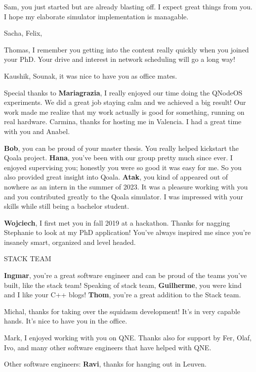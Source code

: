 Sam, you just started but are already blasting off. I expect great things from you.
I hope my elaborate simulator implementation is managable.

Sacha, 
Felix,

Thomas, I remember you getting into the content really quickly when you joined your PhD. Your drive and interest in network scheduling will go a long way!

Kaushik, Sounak, it was nice to have you as office mates.

Special thanks to \textbf{Mariagrazia}, I really enjoyed our time doing the QNodeOS experiments. We did a great job staying calm and we achieved a big result! Our work made me realize that my work actually is good for something, running on real hardware.
Carmina, thanks for hosting me in Valencia. I had a great time with you and Anabel.

\textbf{Bob}, you can be proud of your master thesis. You really helped kickstart the Qoala project.
\textbf{Hana}, you've been with our group pretty much since ever. I enjoyed supervising you; honestly you were so good it was easy for me.
So you also provided great insight into Qoala.
\textbf{Atak}, you kind of appeared out of nowhere as an intern in the summer of 2023. It was a pleasure working with you and you contributed greatly to the Qoala simulator. I was impressed with your skills while still being a bachelor student.

\textbf{Wojciech}, I first met you in fall 2019 at a hackathon. Thanks for nagging Stephanie to look at my PhD application! You've always inspired me since you're insanely smart, organized and level headed.



STACK TEAM

\textbf{Ingmar}, you're a great software engineer and can be proud of the teams you've built, like the stack team!
Speaking of stack team, \textbf{Guilherme}, you were kind and I like your C++ blogs!
\textbf{Thom}, you're a great addition to the Stack team.

Michal, thanks for taking over the squidasm development! It's in very capable hands.
It's nice to have you in the office.

Mark, I enjoyed working with you on QNE. Thanks also for support by Fer, Olaf, Ivo, and many other software engineers that have helped with QNE.

Other software engineers: \textbf{Ravi}, thanks for hanging out in Leuven.



